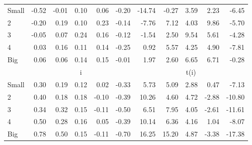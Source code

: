 \begin{table}[!ht]
\begin{tabular}{lrrrrrrrrrr}
    \\
      \cmidrule(r){2-6} \cmidrule(r){7-11}

    Small   & -0.52  & -0.01  & 0.10  & 0.06  & -0.20  & -14.74  & -0.27  & 3.59  & 2.23  & -6.45  \\
         2  & -0.20  & 0.19  & 0.10  & 0.23  & -0.14  & -7.76  & 7.12  & 4.03  & 9.86  & -5.70  \\
         3  & -0.05  & 0.07  & 0.24  & 0.16  & -0.12  & -1.54  & 2.50  & 9.54  & 5.61  & -4.28  \\
         4  & 0.03  & 0.16  & 0.11  & 0.14  & -0.25  & 0.92  & 5.57  & 4.25  & 4.90  & -7.81  \\
    Big     & 0.06  & 0.06  & 0.14  & 0.15  & -0.01  & 1.97  & 2.60  & 6.65  & 6.71  & -0.28  \\

  
    
      & \multicolumn{5}{c}{i} & \multicolumn{5}{c}{t(i)}
    
    \\
      \cmidrule(r){2-6} \cmidrule(r){7-11}

    Small   & 0.30  & 0.19  & 0.12  & 0.02  & -0.33  & 5.73  & 5.09  & 2.88  & 0.47  & -7.13  \\
         2  & 0.40  & 0.18  & 0.18  & -0.10  & -0.39  & 10.26  & 4.60  & 4.72  & -2.88  & -10.80  \\
         3  & 0.34  & 0.32  & 0.15  & -0.11  & -0.50  & 6.51  & 7.95  & 4.05  & -2.61  & -11.61  \\
         4  & 0.50  & 0.28  & 0.16  & 0.05  & -0.39  & 10.14  & 6.36  & 4.16  & 1.04  & -8.07  \\
    Big     & 0.78  & 0.50  & 0.15  & -0.11  & -0.70  & 16.25  & 15.20  & 4.87  & -3.38  & -17.38  \\

  

  \bottomrule
\end{tabular}
\label{tbl:25_Size_Inv_FF2015}
\end{table}
